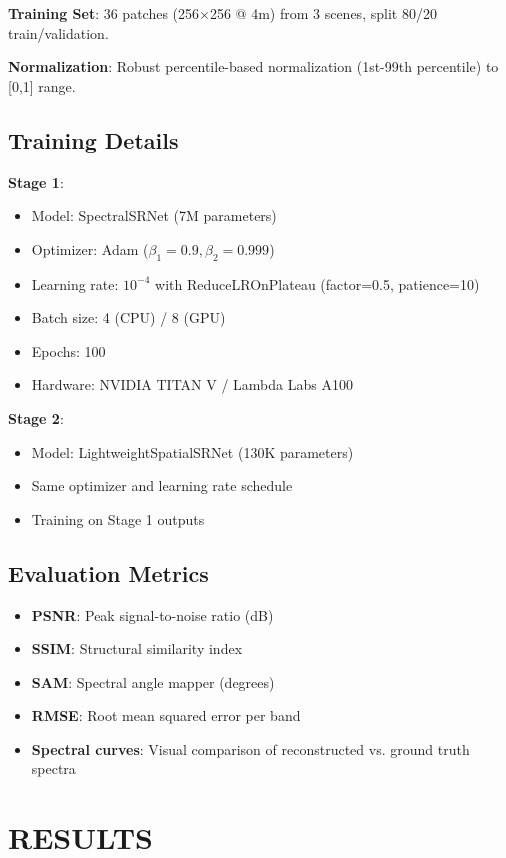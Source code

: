 \documentclass[]{spieman}
\begin{document}
\textbf{Training Set}: 36 patches (256×256 @ 4m) from 3 scenes, split 80/20 train/validation.

\textbf{Normalization}: Robust percentile-based normalization (1st-99th percentile) to [0,1] range.

\subsection{Training Details}

\textbf{Stage 1}:
\begin{itemize}
\item Model: SpectralSRNet (7M parameters)
\item Optimizer: Adam ($\beta_1=0.9, \beta_2=0.999$)
\item Learning rate: $10^{-4}$ with ReduceLROnPlateau (factor=0.5, patience=10)
\item Batch size: 4 (CPU) / 8 (GPU)
\item Epochs: 100
\item Hardware: NVIDIA TITAN V / Lambda Labs A100
\end{itemize}

\textbf{Stage 2}:
\begin{itemize}
\item Model: LightweightSpatialSRNet (130K parameters)
\item Same optimizer and learning rate schedule
\item Training on Stage 1 outputs
\end{itemize}

\subsection{Evaluation Metrics}

\begin{itemize}
\item \textbf{PSNR}: Peak signal-to-noise ratio (dB)
\item \textbf{SSIM}: Structural similarity index
\item \textbf{SAM}: Spectral angle mapper (degrees)
\item \textbf{RMSE}: Root mean squared error per band
\item \textbf{Spectral curves}: Visual comparison of reconstructed vs. ground truth spectra
\end{itemize}

\section{RESULTS}
\label{sec:results}
\end{document}
